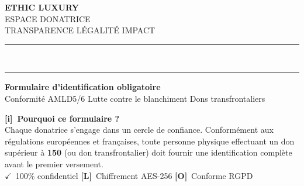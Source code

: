 \documentclass[12pt, a4paper]{article}
\newcommand{\cmark}{\textcolor{ethicGold}{\textbf{$\checkmark$}}}
\newcommand{\info}{\textcolor{ethicGold}{\textbf{[i]}}}
\newcommand{\lockk}{\textcolor{ethicGold}{\textbf{[L]}}}
\newcommand{\globe}{\textcolor{ethicGold}{\textbf{[O]}}}
\newcommand{\euro}{\texteuro}
\begin{document}
\begin{center}
    \vspace*{-1cm}
    {\Huge \textbf{\textcolor{ethicGreen}{ETHIC LUXURY}}} \\[0.3cm]
    {\Large \textcolor{ethicGoldDark}{ESPACE DONATRICE}} \\[0.2cm]
    {\large \textcolor{ethicGreenLight}{TRANSPARENCE LÉGALITÉ IMPACT}} \\[0.5cm]
    \rule{0.9\textwidth}{0.8pt}\\[0.2cm]
    \rule{0.5\textwidth}{0.4pt}
\end{center}

\vspace{0.5cm}

\begin{mainbox}
    \centering
    {\Large \textbf{\textcolor{ethicGreen}{Formulaire d'identification obligatoire}}} \\
    \vspace{0.3cm}
    \textcolor{ethicGoldDark}{Conformité AMLD5/6 Lutte contre le blanchiment Dons transfrontaliers}
\end{mainbox}

\vspace{0.5cm}

\begin{infobox}
    \textbf{\Large \info\ Pourquoi ce formulaire ?} \\
    \vspace{0.3cm}
    Chaque donatrice s'engage dans un cercle de confiance. Conformément aux régulations européennes et françaises, toute personne physique effectuant un don supérieur à \textbf{150 \euro} (ou don transfrontalier) doit fournir une identification complète avant le premier versement. \\
    \vspace{0.2cm}
    {\small \cmark\ 100\% confidentiel \lockk\ Chiffrement AES-256 \globe\ Conforme RGPD}
\end{infobox}

\vspace{0.5cm}
\end{document}
